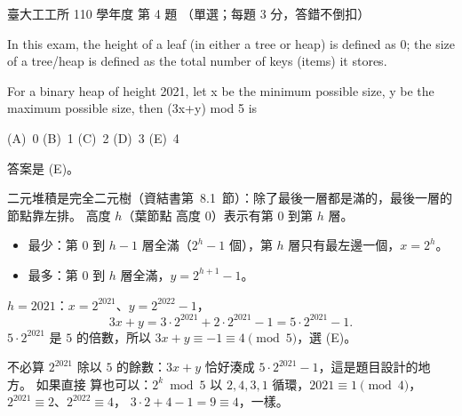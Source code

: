 \begin{pastexam}[label={px:ntu-110-ie-ds-04}]{臺大工工所 110 學年度 第 4 題}
（單選；每題 3 分，答錯不倒扣）

In this exam, the height of a leaf (in either a tree or heap) is defined as 0; the size of a tree/heap is
defined as the total number of keys (items) it stores.

For a binary heap of height 2021, let x be the minimum possible size, y be the maximum possible size,
then (3x+y) mod 5 is

(A)~0 \qquad (B)~1 \qquad (C)~2 \qquad (D)~3 \qquad (E)~4
\end{pastexam}

\begin{pastsoln}
答案是 (E)。

二元堆積是完全二元樹（資結書第~8.1~節）：除了最後一層都是滿的，最後一層的節點靠左排。 高度 $h$（葉節點
高度 $0$）表示有第 $0$ 到第 $h$ 層。
\begin{itemize}
\item 最少：第 $0$ 到 $h - 1$ 層全滿（$2^h - 1$ 個），第 $h$ 層只有最左邊一個，$x = 2^h$。
\item 最多：第 $0$ 到 $h$ 層全滿，$y = 2^{h+1} - 1$。
\end{itemize}
$h = 2021$：$x = 2^{2021}$、$y = 2^{2022} - 1$，
\[
  3x + y = 3 \cdot 2^{2021} + 2 \cdot 2^{2021} - 1 = 5 \cdot 2^{2021} - 1 .
\]
$5 \cdot 2^{2021}$ 是 $5$ 的倍數，所以 $3x + y \equiv -1 \equiv 4 \pmod 5$，選 (E)。

不必算 $2^{2021}$ 除以 $5$ 的餘數：$3x + y$ 恰好湊成 $5 \cdot 2^{2021} - 1$，這是題目設計的地方。 如果直接
算也可以：$2^k \bmod 5$ 以 $2, 4, 3, 1$ 循環，$2021 \equiv 1 \pmod 4$，$2^{2021} \equiv 2$、$2^{2022} \equiv 4$，
$3 \cdot 2 + 4 - 1 = 9 \equiv 4$，一樣。
\end{pastsoln}
